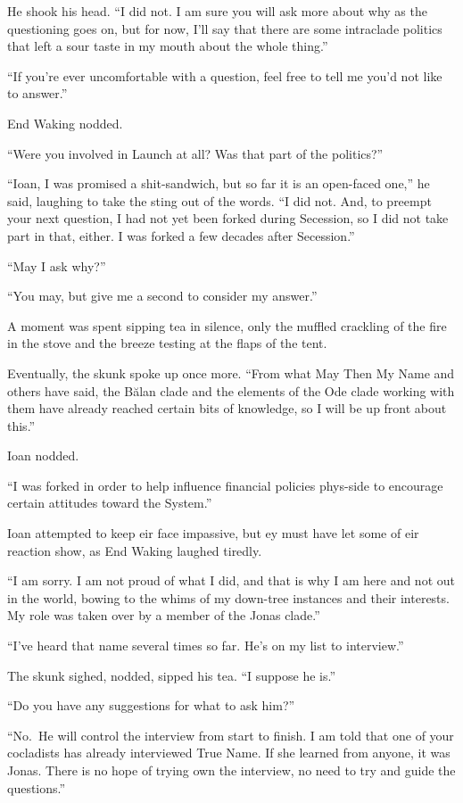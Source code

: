 He shook his head. ``I did not. I am sure you will ask more about why as the questioning goes on, but for now, I'll say that there are some intraclade politics that left a sour taste in my mouth about the whole thing.''

``If you're ever uncomfortable with a question, feel free to tell me you'd not like to answer.''

End Waking nodded.

``Were you involved in Launch at all? Was that part of the politics?''

``Ioan, I was promised a shit-sandwich, but so far it is an open-faced one,'' he said, laughing to take the sting out of the words. ``I did not. And, to preempt your next question, I had not yet been forked during Secession, so I did not take part in that, either. I was forked a few decades after Secession.''

``May I ask why?''

``You may, but give me a second to consider my answer.''

A moment was spent sipping tea in silence, only the muffled crackling of the fire in the stove and the breeze testing at the flaps of the tent.

Eventually, the skunk spoke up once more. ``From what May Then My Name and others have said, the Bălan clade and the elements of the Ode clade working with them have already reached certain bits of knowledge, so I will be up front about this.''

Ioan nodded.

``I was forked in order to help influence financial policies phys-side to encourage certain attitudes toward the System.''

Ioan attempted to keep eir face impassive, but ey must have let some of eir reaction show, as End Waking laughed tiredly.

``I am sorry. I am not proud of what I did, and that is why I am here and not out in the world, bowing to the whims of my down-tree instances and their interests. My role was taken over by a member of the Jonas clade.''

``I've heard that name several times so far. He's on my list to interview.''

The skunk sighed, nodded, sipped his tea. ``I suppose he is.''

``Do you have any suggestions for what to ask him?''

``No.~He will control the interview from start to finish. I am told that one of your cocladists has already interviewed True Name. If she learned from anyone, it was Jonas. There is no hope of trying own the interview, no need to try and guide the questions.''

